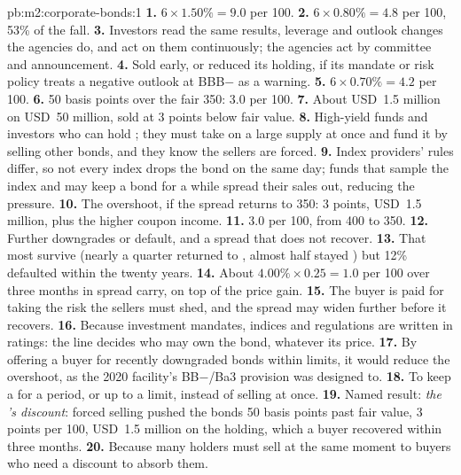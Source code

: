 \begin{solution}{pb:m2:corporate-bonds:1}
\textbf{1.} $6 \times 1.50\% = 9.0$ per 100.
\textbf{2.} $6 \times 0.80\% = 4.8$ per 100, 53\% of the fall.
\textbf{3.} Investors read the same results, leverage and outlook changes the
agencies do, and act on them continuously; the agencies act by committee and
announcement.
\textbf{4.} Sold early, or reduced its holding, if its mandate or risk policy treats a
negative outlook at BBB$-$ as a warning.
\textbf{5.} $6 \times 0.70\% = 4.2$ per 100.
\textbf{6.} 50 basis points over the fair 350: 3.0 per 100.
\textbf{7.} About USD~1.5 million on USD~50 million, sold at 3 points below fair value.
\textbf{8.} High-yield funds and investors who can hold ; they must take on
a large supply at once and fund it by selling other bonds, and they know the sellers
are forced.
\textbf{9.} Index providers' rules differ, so not every index drops the bond on the
same day; funds that sample the index and may keep a bond for a while spread their
sales out, reducing the pressure.
\textbf{10.} The overshoot, if the spread returns to 350: 3 points, USD~1.5 million,
plus the higher coupon income.
\textbf{11.} 3.0 per 100, from 400 to 350.
\textbf{12.} Further downgrades or default, and a spread that does not recover.
\textbf{13.} That most  survive (nearly a quarter returned to , almost half stayed ) but 12\% defaulted within the twenty years.
\textbf{14.} About $4.00\% \times 0.25 = 1.0$ per 100 over three months in spread
carry, on top of the price gain.
\textbf{15.} The buyer is paid for taking the risk the sellers must shed, and the
spread may widen further before it recovers.
\textbf{16.} Because investment mandates, indices and regulations are written in
ratings: the line decides who may own the bond, whatever its price.
\textbf{17.} By offering a buyer for recently downgraded bonds within limits, it
would reduce the overshoot, as the 2020 facility's BB$-$/Ba3 provision was designed to.
\textbf{18.} To keep a  for a period, or up to a limit, instead of selling
at once.
\textbf{19.} Named result: \emph{the 's discount}: forced selling pushed
the bonds 50 basis points past fair value, 3 points per 100, USD~1.5 million on the
holding, which a buyer recovered within three months.
\textbf{20.} Because many holders must sell at the same moment to buyers who need a
discount to absorb them.
\end{solution}

